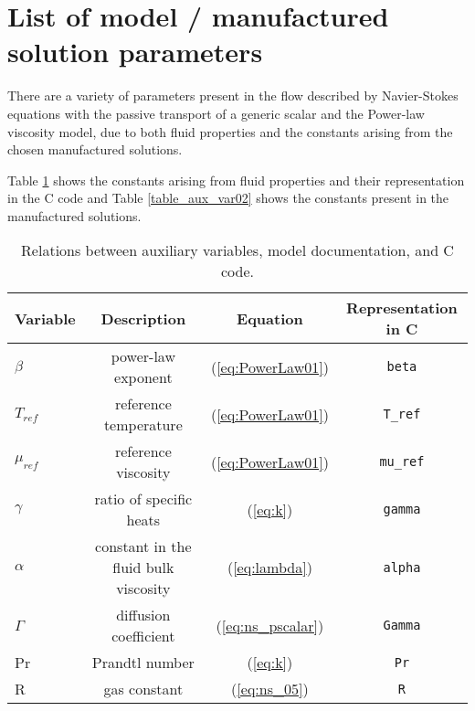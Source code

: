 \section{List of model / manufactured solution parameters}\label{Appendix:01}

There are a variety of parameters present in the flow described by Navier-Stokes equations with the passive transport of a generic scalar and the Power-law viscosity model, due to both fluid properties and the constants arising from the chosen manufactured solutions.



Table \ref{table_aux_var} shows the constants arising from fluid properties and their representation in the C code and Table \ref{table_aux_var02} shows the constants present in the manufactured solutions.


\begin{table}[htb]
\caption{Relations between auxiliary variables, model documentation, and C code.}
\centering
\begin{tabular}{l c c c}
\hline\hline
     Variable    &  Description & Equation &Representation in C  \\ [0.25ex]
\hline 
$\beta$   	& power-law exponent					& (\ref{eq:PowerLaw01})	& \texttt{beta}		\vspace{2pt} \\
$T_{ref}$ 	& reference temperature					& (\ref{eq:PowerLaw01})	& \texttt{T\_ref}		\vspace{2pt} \\
$\mu_{ref}$	& reference viscosity					& (\ref{eq:PowerLaw01})	& \texttt{mu\_ref} 	\vspace{2pt} \\
$\gamma$	& ratio of specific heats				& (\ref{eq:k})			& \texttt{gamma}		\vspace{2pt} \\
$\alpha$ 	& constant in the fluid bulk viscosity  & (\ref{eq:lambda})		& \texttt{alpha}		\vspace{2pt} \\
$\Gamma$	& diffusion coefficient					& (\ref{eq:ns_pscalar})	& \texttt{Gamma}		\vspace{2pt} \\
Pr			& Prandtl number						& (\ref{eq:k})			& \texttt{Pr}		\vspace{2pt} \\
R			& gas constant							& (\ref{eq:ns_05})		& \texttt{R}			\vspace{2pt} \\
\hline
\end{tabular}
\label{table_aux_var}
\end{table}

